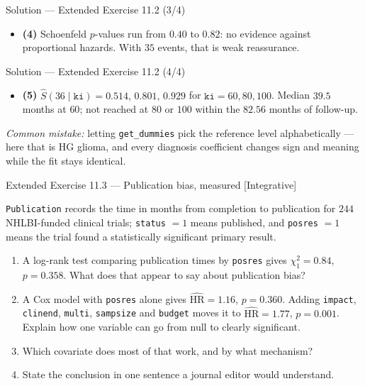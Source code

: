 \documentclass[aspectratio=169,11pt]{beamer}
\begin{document}
\begin{frame}{Solution --- Extended Exercise 11.2 (3/4)}
\begin{solutionbox}
  \begin{itemize}
    \item \textbf{(4)} Schoenfeld $p$-values run from $0.40$ to $0.82$: no evidence
          against proportional hazards. With $35$ events, that is weak reassurance.
  \end{itemize}
\end{solutionbox}
\end{frame}

\begin{frame}{Solution --- Extended Exercise 11.2 (4/4)}
\begin{solutionbox}
  \begin{itemize}
    \item \textbf{(5)} $\hat S(36\mid \texttt{ki})=0.514,\,0.801,\,0.929$ for
          $\texttt{ki}=60,80,100$. Median $39.5$ months at $60$; not reached at $80$ or
          $100$ within the $82.56$ months of follow-up.
  \end{itemize}
  \smallskip
  \textit{Common mistake:} letting \texttt{get\_dummies} pick the reference level
  alphabetically --- here that is HG glioma, and every diagnosis coefficient changes sign
  and meaning while the fit stays identical.
\end{solutionbox}
\end{frame}

\begin{frame}{Extended Exercise 11.3 --- Publication bias, measured [Integrative]}
\begin{longexercise}
  \texttt{Publication} records the time in months from completion to publication for
  $244$ NHLBI-funded clinical trials; \texttt{status} $=1$ means published, and
  \texttt{posres} $=1$ means the trial found a statistically significant primary result.
  \begin{enumerate}
    \item A log-rank test comparing publication times by \texttt{posres} gives
          $\chi^2_1=0.84$, $p=0.358$. What does that appear to say about publication bias?
    \item A Cox model with \texttt{posres} alone gives $\widehat{\mathrm{HR}}=1.16$,
          $p=0.360$. Adding \texttt{impact}, \texttt{clinend}, \texttt{multi},
          \texttt{sampsize} and \texttt{budget} moves it to
          $\widehat{\mathrm{HR}}=1.77$, $p=0.001$. Explain how one variable can go from
          null to clearly significant.
    \item Which covariate does most of that work, and by what mechanism?
    \item State the conclusion in one sentence a journal editor would understand.
  \end{enumerate}
\end{longexercise}
\end{frame}
\end{document}
